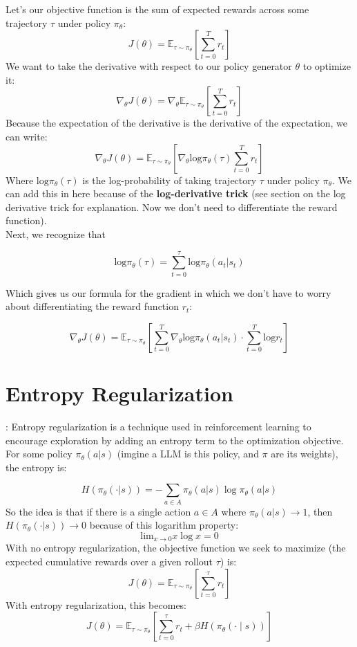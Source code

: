 \documentclass[12pt]{article}
\begin{document}
Let's our objective function is the sum of expected rewards across some trajectory \(\tau\) under policy \(\pi_\theta\):
\[J(\theta) = \mathbb{E}_{\tau \sim \pi_\theta}\left[\sum_{t=0}^Tr_t\right]\]
We want to take the derivative with respect to our policy generator \(\theta\) to optimize it:
\[\nabla_\theta J(\theta) =\nabla_\theta \mathbb{E}_{\tau \sim \pi_\theta}\left[\sum_{t=0}^Tr_t\right]\]
Because the expectation of the derivative is the derivative of the expectation, we can write:
\[\nabla_\theta J(\theta) = \mathbb{E}_{\tau \sim \pi_\theta}\left[\nabla_\theta \text{log}\pi_\theta (\tau)\sum_{t=0}^Tr_t\right]\]
Where \(\text{log}\pi_\theta (\tau)\) is the log-probability of taking trajectory \(\tau\) under policy \(\pi_\theta\). We can add this in here because of the \textbf{log-derivative trick} (see section on the log derivative trick for explanation. Now we don't need to differentiate the reward function).\\

Next, we recognize that 

\[\text{log}\pi_\theta (\tau) = \sum_{t=0}^\tau \text{log} \pi_\theta (a_t | s_t)\]

Which gives us our formula for the gradient in which we don't have to worry about differentiating the reward function \(r_t\):

\[\nabla_\theta J(\theta) =\mathbb{E}_{\tau \sim \pi_\theta}\left[\sum_{t=0}^T \nabla_\theta \text{log} \pi_\theta (a_t | s_t) \cdot \sum_{t=0}^T \text{log} r_t\right]\]

\section{Entropy Regularization}:
Entropy regularization is a technique used in reinforcement learning to encourage exploration by adding an entropy term to the optimization objective. For some policy \(\pi_\theta(a|s)\) (imgine a LLM is this policy, and \(\pi\) are its weights), the entropy is:

\[H(\pi_\theta(\cdot|s)) = -\sum_{a\in A}\pi_\theta(a|s)\log \pi_\theta(a|s)\]
So the idea is that if there is a single action \(a\in A\) where \(\pi_\theta(a|s) \rightarrow 1\), then  \(H(\pi_\theta(\cdot|s)) \rightarrow 0\) because of this logarithm property:
\[\text{lim}_{x \rightarrow 0} x\log x = 0\]
With no entropy regularization, the objective function we seek to maximize (the expected cumulative rewards over a given rollout \(\tau\)) is:
\[
J(\theta) = \mathbb{E}_{\tau \sim \pi_\theta}\left[\sum_{t=0}^{\tau} r_t\right]
\]
With entropy regularization, this becomes:
\[
J(\theta) = \mathbb{E}_{\tau \sim \pi_\theta}\left[\sum_{t=0}^{\tau} r_t + \beta H(\pi_\theta(\cdot \mid s)) \right]
\]
\end{document}
